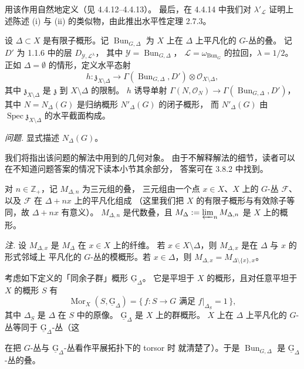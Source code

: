 
用该作用自然地定义（见 4.4.12--4.4.13）。
最后，在 4.4.14 中我们对 $\lambda'_{\mathcal{L}}$ 证明上述陈述 (i) 与 (ii)
的类似物，由此推出水平性定理 2.7.3。

 设 $\Delta\subset X$ 是有限子概形。记
$\operatorname{Bun}_{G,\Delta}$ 为 $X$ 上在 $\Delta$ 上平凡化的 $G$-丛的叠。
记 $D'$ 为 1.1.6 中的层 $D_{\mathcal{Y},\mathcal{L}^{\lambda}}$，
其中 $\mathcal{Y}=\operatorname{Bun}_{G,\Delta}$，
$\mathcal{L}=\omega_{\operatorname{Bun}_G}$ 的拉回，$\lambda=1/2$。
正如 $\Delta=\emptyset$ 的情形，定义水平态射
\[
  h:\mathfrak{z}_{X\setminus\Delta}\longrightarrow
  \Gamma(\operatorname{Bun}_{G,\Delta},D')\otimes\mathcal{O}_{X\setminus\Delta},
\]
其中 $\mathfrak{z}_{X\setminus\Delta}$ 是 $\mathfrak{z}$ 到 $X\setminus\Delta$ 的限制。
$h$ 诱导单射 $\Gamma(N,\mathcal{O}_N)\to\Gamma(\operatorname{Bun}_{G,\Delta},D')$，
其中 $N=N_\Delta(G)$ 是归纳概形 $N'_\Delta(G)$ 的闭子概形，
而 $N'_\Delta(G)$ 由 $\operatorname{Spec}\mathfrak{z}_{X\setminus\Delta}$
的水平截面构成。

\emph{问题.} 显式描述 $N_\Delta(G)$。

我们将指出该问题的解法中用到的几何对象。
由于不解释解法的细节，读者可以在不知道问题答案的情况下读本小节其余部分，
答案可在 3.8.2 中找到。

对 $n\in\mathbb{Z}_+$，记 $M_{\Delta,n}$ 为三元组的叠，
三元组由一个点 $x\in X$、$X$ 上的 $G$-丛 $\mathcal{F}$、
以及 $\mathcal{F}$ 在 $\Delta+nx$ 上的平凡化组成
（这里我们把 $X$ 的有限子概形与有效除子等同，故 $\Delta+nx$ 有意义）。
$M_{\Delta,n}$ 是代数叠，且
$M_\Delta:=\varprojlim_n M_{\Delta,n}$ 是 $X$ 上的概形。

\emph{注.} 设 $M_{\Delta,x}$ 是 $M_\Delta$ 在 $x\in X$ 上的纤维。
若 $x\in X\setminus\Delta$，则 $M_{\Delta,x}$ 是在 $\Delta$ 与 $x$ 的形式邻域上
平凡化的 $G$-丛的模概形。若 $x\in\Delta$，则
$M_{\Delta,x}=M_{\Delta\setminus\{x\},x}$。

考虑如下定义的「同余子群」概形 $\underline{\mathrm{G}}_\Delta$。
它是平坦于 $X$ 的概形，且对任意平坦于 $X$ 的概形 $S$ 有
\[
  \operatorname{Mor}_X(S,\underline{\mathrm{G}}_\Delta)
  =\{\,f:S\to G \text{ 满足 } f|_{\Delta_S}=1\,\},
\]
其中 $\Delta_S$ 是 $\Delta$ 在 $S$ 中的原像。
$\underline{\mathrm{G}}_\Delta$ 是 $X$ 上的群概形。
$X$ 上在 $\Delta$ 上平凡化的 $G$-丛等同于
$\underline{\mathrm{G}}_\Delta$-丛（这


在把 $G$-丛与 $\underline{\mathrm{G}}_\Delta$-丛看作平展拓扑下的 torsor 时
就清楚了）。于是 $\operatorname{Bun}_{G,\Delta}$ 是
$\underline{\mathrm{G}}_\Delta$-丛的叠。

